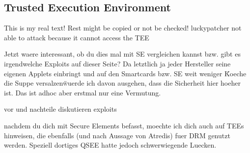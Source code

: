 \subsection{Trusted Execution Environment}\label{subsection:evaluation-external-tee}
This is my real text! Rest might be copied or not be checked!
luckypatcher not able to attack because it cannot access the TEE

Jetzt waere interessant, ob du dies mal mit SE vergleichen kannst bzw. gibt es irgendwelche Exploits auf dieser Seite? Da letztlich ja jeder Hersteller seine eigenen Applets einbringt und auf den Smartcards bzw. SE weit weniger \"Koeche die Suppe versalzen\" wuerde ich davon ausgehen, dass die Sicherheit hier hoeher ist. Das ist adhoc aber erstmal nur eine Vermutung.

vor und nachteile diskutieren
exploits

nachdem du dich mit Secure Elements befasst, moechte ich dich auch auf TEEs hinweisen, die ebenfalls (und nach Aussage von Atredis) fuer DRM genutzt werden. Speziell dortiges QSEE hatte jedoch schwerwiegende Luecken.
